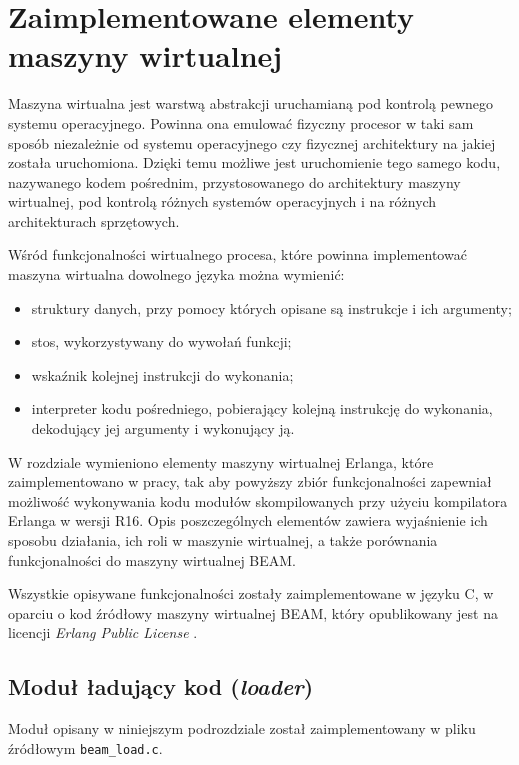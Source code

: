 \chapter{Zaimplementowane elementy maszyny wirtualnej}
\label{cha:maszyna}

Maszyna wirtualna jest warstwą abstrakcji uruchamianą pod kontrolą pewnego systemu operacyjnego.
Powinna ona emulować fizyczny procesor w taki sam sposób niezależnie od systemu operacyjnego czy fizycznej architektury na jakiej została uruchomiona.
Dzięki temu możliwe jest uruchomienie tego samego kodu, nazywanego kodem pośrednim, przystosowanego do architektury maszyny wirtualnej, pod kontrolą różnych systemów operacyjnych i na różnych architekturach sprzętowych.

Wśród funkcjonalności wirtualnego procesa, które powinna implementować maszyna wirtualna dowolnego języka można wymienić:
\begin{itemize}
\item struktury danych, przy pomocy których opisane są instrukcje i ich argumenty;
\item stos, wykorzystywany do wywołań funkcji;
\item wskaźnik kolejnej instrukcji do wykonania;
\item interpreter kodu pośredniego, pobierający kolejną instrukcję do wykonania, dekodujący jej argumenty i wykonujący ją.
\end{itemize}

W rozdziale wymieniono elementy maszyny wirtualnej Erlanga, które zaimplementowano w pracy, tak aby powyższy zbiór funkcjonalności zapewniał możliwość wykonywania kodu modułów skompilowanych przy użyciu kompilatora Erlanga w wersji R16.
Opis poszczególnych elementów zawiera wyjaśnienie ich sposobu działania, ich roli w maszynie wirtualnej, a także porównania
funkcjonalności do maszyny wirtualnej BEAM.

Wszystkie opisywane funkcjonalności zostały zaimplementowane w języku C, w oparciu o kod źródłowy maszyny wirtualnej BEAM, który opublikowany jest na licencji \emph{Erlang Public License} \cite{epl}.

\section{Moduł ładujący kod (\emph{loader})}
\label{sec:maszynaLoader}

Moduł opisany w niniejszym podrozdziale został zaimplementowany w pliku źródłowym \texttt{beam\_load.c}.

